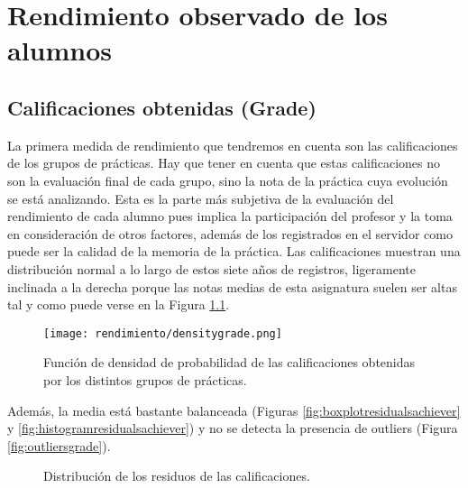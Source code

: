 \chapter{Rendimiento observado de los alumnos}\label{chapter:rendimiento}

\section{Calificaciones obtenidas (Grade)}

La primera medida de rendimiento que tendremos en cuenta son las calificaciones de los grupos de prácticas. Hay que tener en cuenta que estas calificaciones no son la evaluación final de cada grupo, sino la nota de la práctica cuya evolución se está analizando. Esta es la parte más subjetiva de la evaluación del rendimiento de cada alumno pues implica la participación del profesor y la toma en consideración de otros factores, además de los registrados en el servidor como puede ser la calidad de la memoria de la práctica. Las calificaciones muestran una distribución normal a lo largo de estos siete años de registros, ligeramente inclinada a la derecha porque las notas medias de esta asignatura suelen ser altas tal y como puede verse en la Figura \ref{fig:densityplotachiever}.

\begin{figure}[H]
    \centering
    \texttt{[image: rendimiento/densitygrade.png]}
    \caption{Función de densidad de probabilidad de las calificaciones obtenidas por los distintos grupos de prácticas.}
    \label{fig:densityplotachiever}
\end{figure}

Además, la media está bastante balanceada (Figuras \ref{fig:boxplotresidualsachiever} y \ref{fig:histogramresidualsachiever}) y no se detecta la presencia de outliers (Figura \ref{fig:outliersgrade}).

\begin{figure}[H]
\centering
{}\qquad
{}
\caption{Distribución de los residuos de las calificaciones.}
\label{fig:achiever}
\end{figure}

